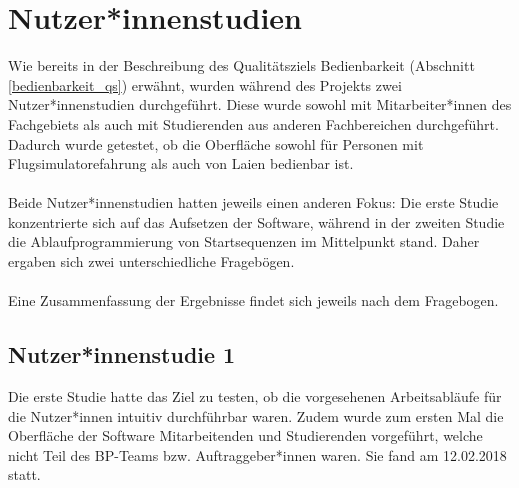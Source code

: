 \section{Nutzer*innenstudien}
Wie bereits in der Beschreibung des Qualitätsziels Bedienbarkeit (Abschnitt \ref{bedienbarkeit_qs})
erwähnt, wurden während des Projekts zwei Nutzer*innenstudien durchgeführt. Diese wurde sowohl mit
Mitarbeiter*innen des Fachgebiets als auch mit Studierenden aus anderen Fachbereichen durchgeführt.
Dadurch wurde getestet, ob die Oberfläche sowohl für Personen mit Flugsimulatorefahrung als auch
von Laien bedienbar ist.
\\\\
Beide Nutzer*innenstudien hatten jeweils einen anderen Fokus:
Die erste Studie konzentrierte sich auf das Aufsetzen der Software, während in der zweiten Studie
die Ablaufprogrammierung von Startsequenzen im Mittelpunkt stand. Daher ergaben sich zwei unterschiedliche
Fragebögen.
\\\\
Eine Zusammenfassung der Ergebnisse findet sich jeweils nach dem Fragebogen.

\subsection{Nutzer*innenstudie 1}
Die erste Studie hatte das Ziel zu testen, ob die vorgesehenen Arbeitsabläufe für die Nutzer*innen
intuitiv durchführbar waren. Zudem wurde zum ersten Mal die Oberfläche der Software Mitarbeitenden und Studierenden
vorgeführt, welche nicht Teil des BP-Teams bzw. Auftraggeber*innen waren. Sie fand am 12.02.2018 statt.


